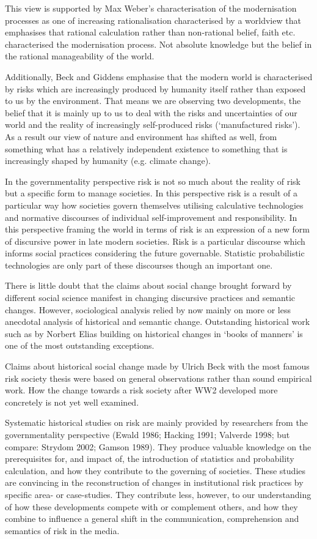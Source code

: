 This view is supported by Max Weber's characterisation of the modernisation processes as one of increasing rationalisation characterised by a worldview that emphasises that rational calculation rather than non-rational belief, faith etc. characterised the modernisation process. Not absolute knowledge but the belief in the rational manageability of the world.

Additionally, Beck and Giddens emphasise that the modern world is characterised by risks which are increasingly produced by humanity itself rather than exposed to us by the environment. That means we are observing two developments, the belief that it is mainly up to us to deal with the risks and uncertainties of our world and the reality of increasingly self-produced risks (`manufactured risks'). As a result our view of nature and environment has shifted as well, from something what has a relatively independent existence to something that is increasingly shaped by humanity (e.g. climate change).

In the governmentality perspective risk is not so much about the reality of risk but a specific form to manage societies. In this perspective risk is a result of a particular way how societies govern themselves utilising calculative technologies and normative discourses of individual self-improvement and responsibility. In this perspective framing the world in terms of risk is an expression of a new form of discursive power in late modern societies. Risk is a particular discourse which informs social practices considering the future governable. Statistic probabilistic technologies are only part of these discourses though an important one.

There is little doubt that the claims about social change brought forward by different social science manifest in changing discursive practices and semantic changes. However, sociological analysis relied by now mainly on more or less anecdotal analysis of historical and semantic change. Outstanding historical work such as by Norbert Elias building on historical changes in `books of manners' is one of the most outstanding exceptions. 

Claims about historical social change made by Ulrich Beck with the most famous risk society thesis were based on general observations rather than sound empirical work. How the change towards a risk society after WW2 developed more concretely is not yet well examined.

Systematic historical studies on risk are mainly provided by researchers from the governmentality perspective (Ewald 1986; Hacking 1991; Valverde 1998; but compare: Strydom 2002; Gamson 1989). They produce valuable knowledge on the prerequisites for, and impact of, the introduction of statistics and probability calculation, and how they contribute to the governing of societies. These studies are convincing in the reconstruction of changes in institutional risk practices by specific area- or case-studies. They contribute less, however, to our understanding of how these developments compete with or complement others, and how they combine to influence a general shift in the communication, comprehension and semantics of risk in the media. 

